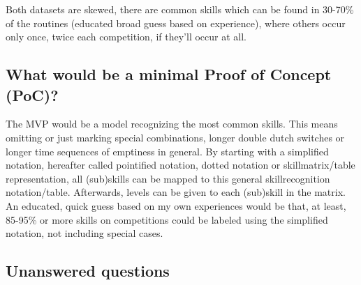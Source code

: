 Both datasets are skewed, there are common skills which can be found in 30-70\% of the routines (educated broad guess based on experience), where others occur only once, twice each competition, if they'll occur at all.

\subsection{What would be a minimal Proof of Concept (PoC)?}

The MVP would be a model recognizing the most common skills.
This means omitting or just marking special combinations, longer double dutch switches or longer time sequences of emptiness in general.
By starting with a simplified notation, hereafter called pointified notation, dotted notation or skillmatrix/table representation, all (sub)skills can be mapped to this general skillrecognition notation/table.
Afterwards, levels can be given to each (sub)skill in the matrix.
An educated, quick guess based on my own experiences would be that, at least, 85-95\% or more skills on competitions could be labeled using the simplified notation, not including special cases.

\subsection{Unanswered questions}



